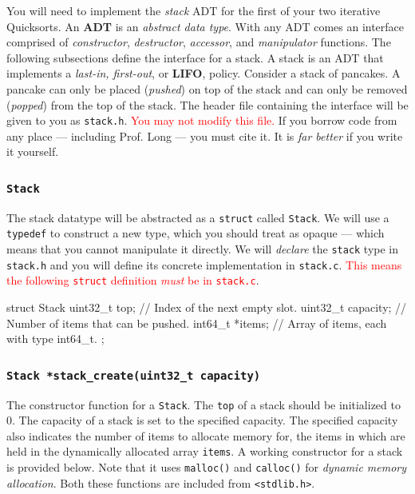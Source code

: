 \documentclass[11pt]{article}
\begin{document}
You will need to implement the \emph{stack} ADT for the first of your
two iterative Quicksorts. An \textbf{ADT} is an \emph{abstract data
type}. With any ADT comes an interface comprised of \emph{constructor},
\emph{destructor}, \emph{accessor}, and \emph{manipulator} functions.
The following subsections define the interface for a stack. A stack is
an ADT that implements a \emph{last-in, first-out}, or \textbf{LIFO},
policy. Consider a stack of pancakes. A pancake can only be placed
(\emph{pushed}) on top of the stack and can only be removed
(\emph{popped}) from the top of the stack. The header file containing
the interface will be given to you as \texttt{stack.h}.
\textcolor{red}{You may not modify this file.} If you borrow code from
any place --- including Prof. Long --- you must cite it. It is \emph{far
better} if you write it yourself.

\subsubsection{\texttt{Stack}}

The stack datatype will be abstracted as a \texttt{struct} called
\texttt{Stack}. We will use a \texttt{typedef} to construct a new type,
which you should treat as opaque --- which means that you cannot
manipulate it directly. We will \emph{declare} the \texttt{stack} type
in \texttt{stack.h} and you will define its concrete implementation in
\texttt{stack.c}. \textcolor{red}{This means the following \texttt{struct} definition
\emph{must} be in \texttt{stack.c}}.

\begin{codelisting}{}
struct Stack {
  uint32_t top;       // Index of the next empty slot.
  uint32_t capacity;  // Number of items that can be pushed.
  int64_t *items;     // Array of items, each with type int64_t.
};
\end{codelisting}

\subsubsection{\texttt{Stack *stack\_create(uint32\_t capacity)}}

The constructor function for a \texttt{Stack}. The \texttt{top} of a
stack should be initialized to 0. The capacity of a stack is set to the
specified capacity. The specified capacity also indicates the number of
items to allocate memory for, the items in which are held in the
dynamically allocated array \texttt{items}. A working constructor for a
stack is provided below. Note that it uses \texttt{malloc()} and
\texttt{calloc()} for \emph{dynamic memory allocation}. Both these
functions are included from \texttt{<stdlib.h>}.
\end{document}
